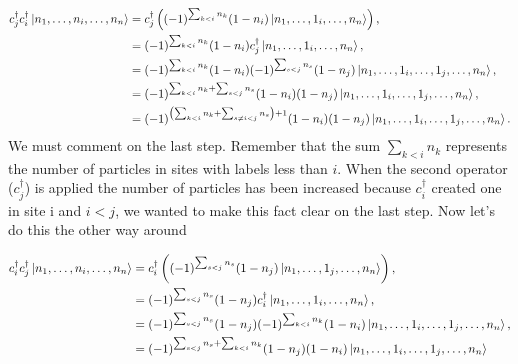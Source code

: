 \begin{equation}
    \begin{aligned}[b]
        c_j^\dagger c_i^\dagger \ket{n_1,\ldots,n_i,\ldots,n_n} &= c_j^\dagger \left((-1)^{\sum_{k<i}n_k} (1-n_i)\ket{n_1,\ldots,1_i,\ldots,n_n} \right),\\
        &=(-1)^{\sum_{k<i}n_k} (1-n_i)c_j^\dagger\ket{n_1,\ldots,1_i,\ldots,n_n},\\
        &=(-1)^{\sum_{k<i}n_k} (1-n_i) (-1)^{\sum_{s<j}n_s} (1-n_j)\ket{n_1,\ldots,1_i,\ldots,1_j,\ldots,n_n},\\
        &=(-1)^{\sum_{k<i}n_k + \sum_{s<j}n_s} (1-n_i) (1-n_j)\ket{n_1,\ldots,1_i,\ldots,1_j,\ldots,n_n},\\
        &=(-1)^{\left(\sum_{k<i}n_k + \sum_{s\neq i<j}n_s\right) + 1} (1-n_i) (1-n_j)\ket{n_1,\ldots,1_i,\ldots,1_j,\ldots,n_n}.
    \end{aligned}
    \label{24}
\end{equation}
We must comment on the last step. Remember that the sum $\sum_{k<i}n_k $ represents the number of particles in sites with labels less than $i$. When the second operator ($c_j^\dagger$) is applied the number of particles has been increased because $c_i^\dagger$ created one in site i and $i<j$, we wanted to make this fact clear on the last step. Now let's do this the other way around

\begin{equation}
    \begin{aligned}[b]
        c_i^\dagger c_j^\dagger \ket{n_1,\ldots,n_i,\ldots,n_n} &= c_i^\dagger \left((-1)^{\sum_{s<j}n_s} (1-n_j)\ket{n_1,\ldots,1_j,\ldots,n_n} \right),\\
        &=(-1)^{\sum_{s<j}n_s} (1-n_j)c_i^\dagger\ket{n_1,\ldots,1_i,\ldots,n_n},\\
        &=(-1)^{\sum_{s<j}n_s} (1-n_j)(-1)^{\sum_{k<i}n_k} (1-n_i)\ket{n_1,\ldots,1_i,\ldots,1_j,\ldots,n_n},\\
        &=(-1)^{\sum_{s<j}n_s + \sum_{k<i}n_k} (1-n_j) (1-n_i)\ket{n_1,\ldots,1_i,\ldots,1_j,\ldots,n_n}
    \end{aligned}\label{25}
\end{equation}

